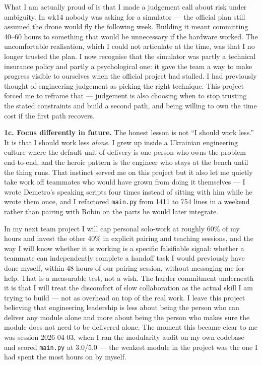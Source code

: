 What I am actually proud of is that I made a judgement call about risk under ambiguity. In wk14 nobody was asking for a simulator --- the official plan still assumed the drone would fly the following week. Building it meant committing 40--60 hours to something that would be unnecessary if the hardware worked. The uncomfortable realisation, which I could not articulate at the time, was that I no longer trusted the plan. I now recognise that the simulator was partly a technical insurance policy and partly a psychological one: it gave the team a way to make progress visible to ourselves when the official project had stalled. I had previously thought of engineering judgement as picking the right technique. This project forced me to reframe that --- judgement is also choosing when to stop trusting the stated constraints and build a second path, and being willing to own the time cost if the first path recovers.

\textbf{1c. Focus differently in future.} The honest lesson is not ``I should work less.'' It is that I should work less \emph{alone}. I grew up inside a Ukrainian engineering culture where the default unit of delivery is one person who owns the problem end-to-end, and the heroic pattern is the engineer who stays at the bench until the thing runs. That instinct served me on this project but it also let me quietly take work off teammates who would have grown from doing it themselves --- I wrote Demetro's speaking scripts four times instead of sitting with him while he wrote them once, and I refactored \texttt{main.py} from 1411 to 754 lines in a weekend rather than pairing with Robin on the parts he would later integrate.

In my next team project I will cap personal solo-work at roughly 60\% of my hours and invest the other 40\% in explicit pairing and teaching sessions, and the way I will know whether it is working is a specific falsifiable signal: whether a teammate can independently complete a handoff task I would previously have done myself, within 48 hours of our pairing session, without messaging me for help. That is a measurable test, not a wish. The harder commitment underneath it is that I will treat the discomfort of slow collaboration as the actual skill I am trying to build --- not as overhead on top of the real work. I leave this project believing that engineering leadership is less about being the person who can deliver any module alone and more about being the person who makes sure the module does not need to be delivered alone. The moment this became clear to me was session 2026-04-03, when I ran the modularity audit on my own codebase and scored \texttt{main.py} at 3.0/5.0 --- the weakest module in the project was the one I had spent the most hours on by myself.
